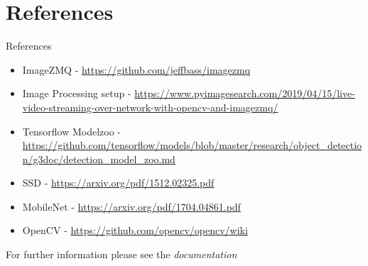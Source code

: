 \documentclass{beamer}
\begin{document}
\section{References}

\begin{frame}{References}
\begin{itemize}
\footnotesize
\item ImageZMQ - \url{https://github.com/jeffbass/imagezmq}
\item Image Processing setup - \url{https://www.pyimagesearch.com/2019/04/15/live-video-streaming-over-network-with-opencv-and-imagezmq/}
\item Tensorflow Modelzoo - \url{https://github.com/tensorflow/models/blob/master/research/object_detection/g3doc/detection_model_zoo.md}
\item SSD - \url{https://arxiv.org/pdf/1512.02325.pdf}
\item MobileNet - \url{https://arxiv.org/pdf/1704.04861.pdf}
\item OpenCV - \url{https://github.com/opencv/opencv/wiki}
\end{itemize}
\vspace{3mm}
For further information please see the \textit{documentation}
\end{frame}
\end{document}
